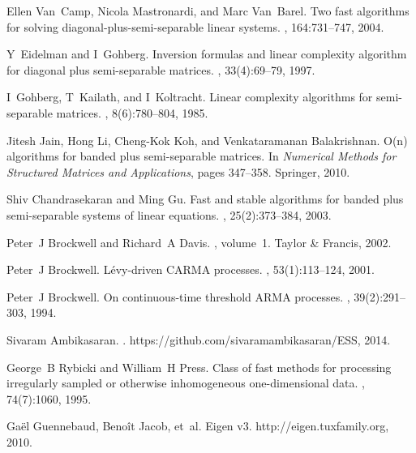 \documentclass[times]{nlaauth}
\begin{document}
\begin{thebibliography}{10}
Ellen Van~Camp, Nicola Mastronardi, and Marc Van~Barel.
\newblock Two fast algorithms for solving diagonal-plus-semi-separable linear
  systems.
, 164:731--747,
  2004.

Y~Eidelman and I~Gohberg.
\newblock Inversion formulas and linear complexity algorithm for diagonal plus
  semi-separable matrices.
, 33(4):69--79, 1997.

I~Gohberg, T~Kailath, and I~Koltracht.
\newblock Linear complexity algorithms for semi-separable matrices.
, 8(6):780--804, 1985.

Jitesh Jain, Hong Li, Cheng-Kok Koh, and Venkataramanan Balakrishnan.
\newblock O(n) algorithms for banded plus semi-separable matrices.
\newblock In {\em Numerical Methods for Structured Matrices and Applications},
  pages 347--358. Springer, 2010.

Shiv Chandrasekaran and Ming Gu.
\newblock Fast and stable algorithms for banded plus semi-separable systems of
  linear equations.
,
  25(2):373--384, 2003.

Peter~J Brockwell and Richard~A Davis.
, volume~1.
\newblock Taylor \& Francis, 2002.

Peter~J Brockwell.
\newblock L{\'e}vy-driven {CARMA} processes.
,
  53(1):113--124, 2001.

Peter~J Brockwell.
\newblock On continuous-time threshold {ARMA} processes.
, 39(2):291--303,
  1994.

Sivaram Ambikasaran.
.
\newblock https://github.com/sivaramambikasaran/ESS, 2014.

George~B Rybicki and William~H Press.
\newblock Class of fast methods for processing irregularly sampled or otherwise
  inhomogeneous one-dimensional data.
, 74(7):1060, 1995.

Ga\"{e}l Guennebaud, Beno\^{i}t Jacob, et~al.
\newblock Eigen v3.
\newblock http://eigen.tuxfamily.org, 2010.


\end{thebibliography}
\end{document}
